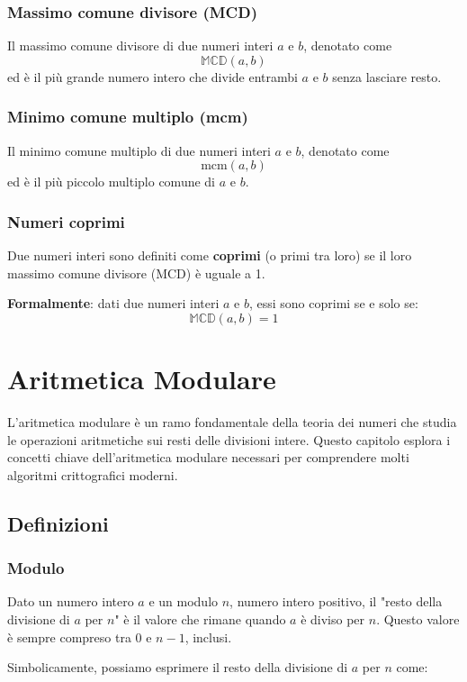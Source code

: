 \documentclass[a4paper,12pt]{report}
\begin{document}
\subsection*{Massimo comune divisore (MCD)}
Il massimo comune divisore di due numeri interi \( a \) e \( b \), denotato come 
\[ \mathbb{MCD}(a, b) \] 
ed è il più grande numero intero che divide entrambi \( a \) e \( b \) senza lasciare resto.

\subsection*{Minimo comune multiplo (mcm)}
Il minimo comune multiplo di due numeri interi \( a \) e \( b \), denotato come 
\[ \mathrm{mcm}(a, b) \]
ed è il più piccolo multiplo comune di \( a \) e \( b \).

\subsection*{Numeri coprimi}
Due numeri interi sono definiti come \textbf{coprimi} (o primi tra loro) se il loro massimo comune divisore (MCD) è uguale a 1. 

\textbf{Formalmente}: dati due numeri interi \(a\) e \(b\), essi sono coprimi se e solo se:
\[\mathbb{MCD}(a, b) = 1\]

\chapter{Aritmetica Modulare}

L'aritmetica modulare è un ramo fondamentale della teoria dei numeri che studia le operazioni aritmetiche sui resti delle divisioni intere. Questo capitolo esplora i concetti chiave dell'aritmetica modulare necessari per comprendere molti algoritmi crittografici moderni.

\section{Definizioni} \subsection*{Modulo} Dato un numero intero $a$ e un modulo $n$, numero intero positivo, il "resto della divisione di $a$ per $n$" è il valore che rimane quando $a$ è diviso per $n$. Questo valore è sempre compreso tra 0 e $n-1$, inclusi.

Simbolicamente, possiamo esprimere il resto della divisione di $a$ per $n$ come:
\end{document}
